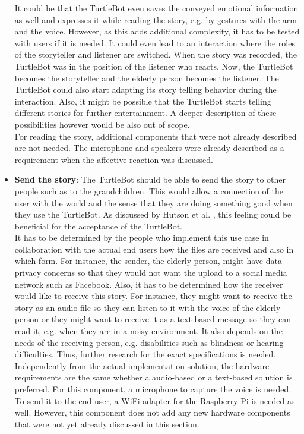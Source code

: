 \documentclass[plainarticle,zihtitle,english,final,hyperref,utf8]{zihpub}
\begin{document}
\begin{itemize}
    \newline
    It could be that the TurtleBot even saves the conveyed emotional information as well and expresses it while reading the story, e.g. by gestures with the arm and the voice. However, as this adds additional complexity, it has to be tested with users if it is needed. It could even lead to an interaction where the roles of the storyteller and listener are switched. When the story was recorded, the TurtleBot was in the position of the listener who reacts. Now, the TurtleBot becomes the storyteller and the elderly person becomes the listener. The TurtleBot could also start adapting its story telling behavior during the interaction. Also, it might be possible that the TurtleBot starts telling different stories for further entertainment. A deeper description of these possibilities however would be also out of scope.\\
    \newline
    For reading the story, additional components that were not already described are not needed. The microphone and speakers were already described as a requirement when the affective reaction was discussed.\\
    \item \textbf{Send the story}: The TurtleBot should be able to send the story to other people such as to the grandchildren. This would allow a connection of the user with the world and the sense that they are doing something good when they use the TurtleBot. As discussed by Hutson et al. \cite{hutson11}, this feeling could be beneficial for the acceptance of the TurtleBot.\\
    \newline
    It has to be determined by the people who implement this use case in collaboration with the actual end users how the files are received and also in which form. For instance, the sender, the elderly person, might have data privacy concerns so that they would not want the upload to a social media network such as Facebook. Also, it has to be determined how the receiver would like to receive this story. For instance, they might want to receive the story as an audio-file so they can listen to it with the voice of the elderly person or they might want to receive it as a text-based message so they can read it, e.g. when they are in a noisy environment. It also depends on the needs of the receiving person, e.g. disabilities such as blindness or hearing difficulties. Thus, further research for the exact specifications is needed.\\
    \newline
    Independently from the actual implementation solution, the hardware requirements are the same whether a audio-based or a text-based solution is preferred. For this component, a microphone to capture the voice is needed. To send it to the end-user, a WiFi-adapter for the Raspberry Pi is needed as well. However, this component does not add any new hardware components that were not yet already discussed in this section.
\end{itemize}
\end{document}
